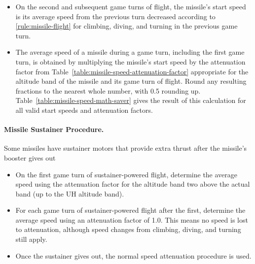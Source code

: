 \begin{advancedrules}
{\begin{itemize}
\item
On the second and subsequent game turns of flight, the missile’s start speed is its average speed from the previous turn decreased according to \ref{rule:missile-flight} for climbing, diving, and turning in the previous game turn.

\item 
The average speed of a missile during a game turn, including the first game turn, is obtained by multiplying the missile’s start speed by the attenuation factor from Table~\ref{table:missile-speed-attenuation-factor} appropriate for the altitude band of the missile and its game turn of flight. Round any resulting fractions to the nearest whole number, with 0.5 rounding up. Table~\ref{table:missile-speed-math-saver} gives the result of this calculation for all valid start speeds and attenuation factors.
\end{itemize}

\paragraph{Missile Sustainer Procedure.} Some missiles have sustainer motors that provide extra thrust after the missile’s booster gives out

\begin{itemize}
    \item On the first game turn of sustainer-powered flight, determine the average speed using the attenuation factor for the altitude band two above the actual band (up to the UH altitude band).
    
    \item For each game turn of sustainer-powered flight after the first, determine the average speed using an attenuation factor of 1.0. This means no speed is lost to attenuation, although speed changes from climbing, diving, and turning still apply.

    \item Once the sustainer gives out, the normal speed attenuation procedure is used.
\end{itemize}

}

\end{advancedrules}
